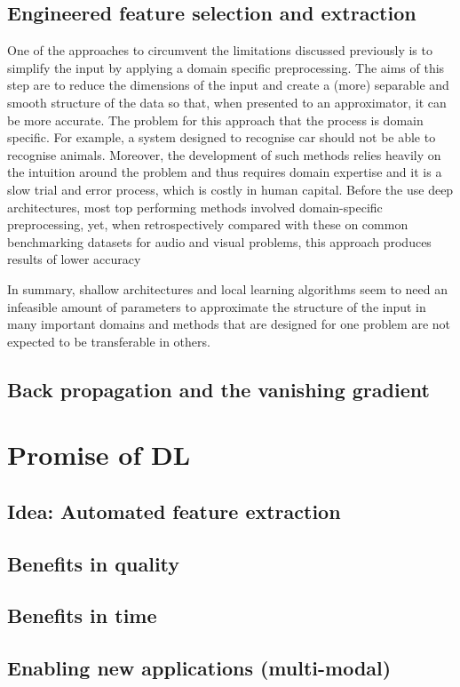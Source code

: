 \documentclass[a4paper]{report}
\begin{document}
	\subsection{Engineered feature selection and extraction}
		One of the approaches to circumvent the limitations discussed previously is to simplify the input by applying a domain specific preprocessing. The aims of this step are to reduce the dimensions of the input and create a (more) separable and smooth structure of the data so that, when presented to an approximator, it can be more accurate. The problem for this approach that the process is domain specific\cite{Bengio2007}. For example, a system designed to recognise car should not  be able to recognise animals. Moreover, the development of such methods relies heavily on the intuition around the problem and thus requires domain expertise and it is a slow trial and error process, which is costly in human capital. Before the use deep architectures, most top performing methods involved domain-specific preprocessing, yet, when retrospectively compared with these on common benchmarking datasets for audio and visual problems, this approach produces results of lower accuracy \cite{Krizhevsky2012}
	
	In summary, shallow architectures and local learning algorithms seem to need an infeasible amount of parameters to approximate the structure of the input in many important domains and  methods that are designed for one problem are not expected to be transferable in others.
	\subsection{Back propagation and  the vanishing gradient}
	
\section{Promise of DL}	
	\subsection{Idea: Automated feature extraction}
	\subsection{Benefits in quality}
	\subsection{Benefits in time}
	\subsection{Enabling new applications (multi-modal)}
\end{document}
